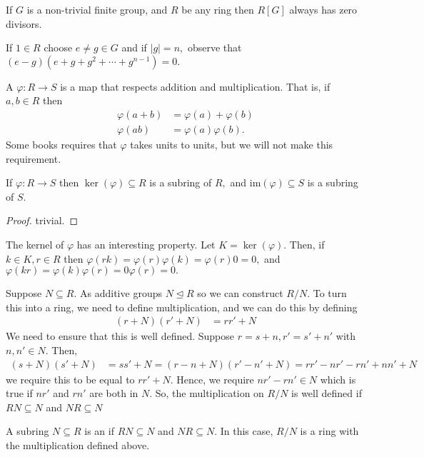 \documentclass[a4paper]{article}
\begin{document}
If $G$ is a non-trivial finite group, and $R$ be any ring then $R[G]$ always has zero divisors.

If $1\in R$ choose $e\neq g\in G$ and if $|g|=n,$ observe that $(e-g)(e+g+g^2+\cdots+g^{n-1})=0.$
\begin{definition}
    A  $\varphi:R\to S$ is a map that respects addition and multiplication. That is, if $a,b\in R$ then \begin{align}
        \varphi(a+b)&=\varphi(a)+\varphi(b)\\
        \varphi(ab)&=\varphi(a)\varphi(b).
    \end{align}
    Some books requires that $\varphi$ takes units to units, but we will not make this requirement.
\end{definition}
\begin{proposition}
    If $\varphi:R\to S$ then $\ker(\varphi)\subseteq R$ is a subring of $R,$ and $\mathrm{im}(\varphi)\subseteq S$ is a subring of $S.$
    \begin{proof}
        trivial.
    \end{proof}
\end{proposition}
The kernel of $\varphi$ has an interesting property. Let $K=\ker(\varphi).$ Then, if $k\in K,r\in R$ then $\varphi(rk)=\varphi(r)\varphi(k)=\varphi(r)0=0,$ and $\varphi(kr)=\varphi(k)\varphi(r)=0\varphi(r)=0.$

Suppose $N\subseteq R.$ As additive groups $N\trianglelefteq R$ so we can construct $R/N.$ To turn this into a ring, we need to define multiplication, and we can do this by defining \begin{align}
    (r+N)(r'+N)&=rr'+N
\end{align}
We need to ensure that this is well defined. Suppose $r=s+n,r'=s'+n'$ with $n,n'\in N.$ Then, \begin{align}
    (s+N)(s'+N)&=ss'+N=(r-n+N)(r'-n'+N)=rr'-nr'-rn'+nn'+N
\end{align}
we require this to be equal to $rr'+N.$ Hence, we require $nr'-rn'\in N$ which is true if $nr'$ and $rn'$ are both in $N.$ So, the multiplication on $R/N$ is well defined if $RN\subseteq N$ and $NR\subseteq N$ \begin{definition}[Ideal]
    A subring $N\subseteq R$ is an  if $RN\subseteq N$ and $NR\subseteq N.$ In this case, $R/N$ is a ring with the multiplication defined above.
\end{definition}
\end{document}

